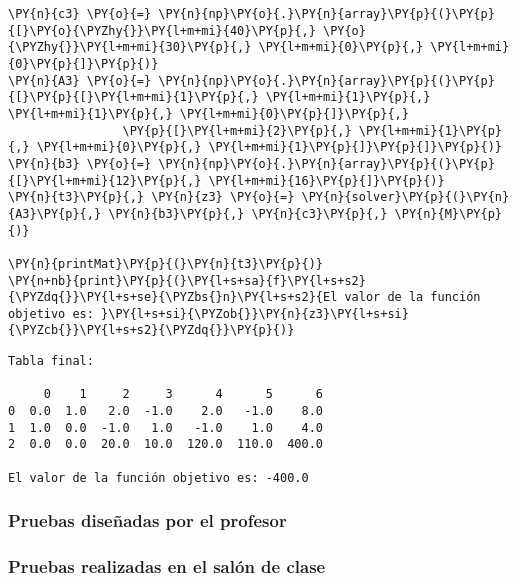 \documentclass[12pt]{article}
\begin{document}
\begin{tcolorbox}[breakable, size=fbox, boxrule=1pt, pad at break*=1mm,colback=cellbackground, colframe=cellborder]
\begin{Verbatim}[commandchars=\\\{\}]
\PY{n}{c3} \PY{o}{=} \PY{n}{np}\PY{o}{.}\PY{n}{array}\PY{p}{(}\PY{p}{[}\PY{o}{\PYZhy{}}\PY{l+m+mi}{40}\PY{p}{,} \PY{o}{\PYZhy{}}\PY{l+m+mi}{30}\PY{p}{,} \PY{l+m+mi}{0}\PY{p}{,} \PY{l+m+mi}{0}\PY{p}{]}\PY{p}{)}
\PY{n}{A3} \PY{o}{=} \PY{n}{np}\PY{o}{.}\PY{n}{array}\PY{p}{(}\PY{p}{[}\PY{p}{[}\PY{l+m+mi}{1}\PY{p}{,} \PY{l+m+mi}{1}\PY{p}{,} \PY{l+m+mi}{1}\PY{p}{,} \PY{l+m+mi}{0}\PY{p}{]}\PY{p}{,}
                \PY{p}{[}\PY{l+m+mi}{2}\PY{p}{,} \PY{l+m+mi}{1}\PY{p}{,} \PY{l+m+mi}{0}\PY{p}{,} \PY{l+m+mi}{1}\PY{p}{]}\PY{p}{]}\PY{p}{)}
\PY{n}{b3} \PY{o}{=} \PY{n}{np}\PY{o}{.}\PY{n}{array}\PY{p}{(}\PY{p}{[}\PY{l+m+mi}{12}\PY{p}{,} \PY{l+m+mi}{16}\PY{p}{]}\PY{p}{)}
\PY{n}{t3}\PY{p}{,} \PY{n}{z3} \PY{o}{=} \PY{n}{solver}\PY{p}{(}\PY{n}{A3}\PY{p}{,} \PY{n}{b3}\PY{p}{,} \PY{n}{c3}\PY{p}{,} \PY{n}{M}\PY{p}{)}

\PY{n}{printMat}\PY{p}{(}\PY{n}{t3}\PY{p}{)}
\PY{n+nb}{print}\PY{p}{(}\PY{l+s+sa}{f}\PY{l+s+s2}{\PYZdq{}}\PY{l+s+se}{\PYZbs{}n}\PY{l+s+s2}{El valor de la función objetivo es: }\PY{l+s+si}{\PYZob{}}\PY{n}{z3}\PY{l+s+si}{\PYZcb{}}\PY{l+s+s2}{\PYZdq{}}\PY{p}{)}
\end{Verbatim}
\end{tcolorbox}

    \begin{Verbatim}[commandchars=\\\{\}]
Tabla final:

     0    1     2     3      4      5      6
0  0.0  1.0   2.0  -1.0    2.0   -1.0    8.0
1  1.0  0.0  -1.0   1.0   -1.0    1.0    4.0
2  0.0  0.0  20.0  10.0  120.0  110.0  400.0

El valor de la función objetivo es: -400.0
    \end{Verbatim}

\subsubsection{Pruebas diseñadas por el profesor}



\subsubsection{Pruebas realizadas en el salón de clase}

\end{document}
